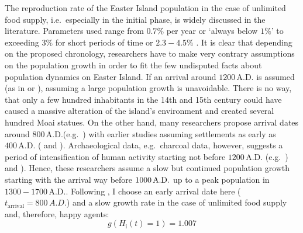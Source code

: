 The reproduction rate of the Easter Island population in the case of unlimited food supply, i.e.\ especially in the initial phase, is widely discussed in the literature.
Parameters used range from $0.7\%$ per year \citep{Bahn2017} or `always below $1\%$' \citep{Brander1998} to exceeding $3\%$ \citep{Hunt2006} for short periods of time or $2.3-4.5\%$ \citep{Brandt2015}.
It is clear that depending on the proposed chronology, researchers have to make very contrary assumptions on the population growth in order to fit the few undisputed facts about population dynamics on Easter Island. 
If an arrival around $1200\, \text{A.D.}$ is assumed (as in \citet{Hunt2007} or \citet{Brandt2015}), assuming a large population growth is unavoidable. 
There is no way, that only a few hundred inhabitants in the 14th and 15th century could have caused a massive alteration of the island's environment and created several hundred Moai statues.
On the other hand, many researchers propose arrival dates around $800\, \text{A.D.}$(e.g.\ \citet{Bahn2017}) with earlier studies assuming settlements as early as $400\, \text{A.D.}$ (\citet{Good2006} and \citet{Brander1998}).
Archaeological data, e.g.\ charcoal data, however, suggests a period of intensification of human activity starting not before $1200\, \text{A.D.}$ (e.g.\ \citet{Bahn2017}) and \citet{Hunt2006}).
Hence, these researchers assume a slow but continued population growth starting with the arrival way before $1000\, {\rm A.D.}$ up to a peak population in $1300-1700\, \text{A.D.}$.
Following \citet{Bahn2017}, I choose an early arrival date here ($t_\text{arrival}=800\, A.D.$) and a slow growth rate in the case of unlimited food supply and, therefore, happy agents: 
\begin{equation}
	g(H_\text{i}(t)=1) = 1.007
\end{equation}

